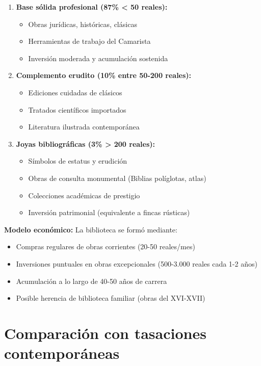\documentclass[12pt,a4paper]{article}
\begin{document}
\begin{enumerate}
    \item \textbf{Base sólida profesional (87\% < 50 reales):}
    \begin{itemize}
        \item Obras jurídicas, históricas, clásicas
        \item Herramientas de trabajo del Camarista
        \item Inversión moderada y acumulación sostenida
    \end{itemize}

    \item \textbf{Complemento erudito (10\% entre 50-200 reales):}
    \begin{itemize}
        \item Ediciones cuidadas de clásicos
        \item Tratados científicos importados
        \item Literatura ilustrada contemporánea
    \end{itemize}

    \item \textbf{Joyas bibliográficas (3\% > 200 reales):}
    \begin{itemize}
        \item Símbolos de estatus y erudición
        \item Obras de consulta monumental (Biblias políglotas, atlas)
        \item Colecciones académicas de prestigio
        \item Inversión patrimonial (equivalente a fincas rústicas)
    \end{itemize}
\end{enumerate}

\textbf{Modelo económico:} La biblioteca se formó mediante:
\begin{itemize}
    \item Compras regulares de obras corrientes (20-50 reales/mes)
    \item Inversiones puntuales en obras excepcionales (500-3.000 reales cada 1-2 años)
    \item Acumulación a lo largo de 40-50 años de carrera
    \item Posible herencia de biblioteca familiar (obras del XVI-XVII)
\end{itemize}

\section{Comparación con tasaciones contemporáneas}
\end{document}
